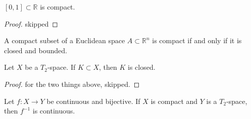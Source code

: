 \begin{thmbox}
    \begin{lemma}
        \([0, 1] \subset \mathbb{R}\) is {\color{maththen}compact}.
    \end{lemma}
\end{thmbox}

\begin{proof}
    skipped
\end{proof}

\begin{thmbox}
    \begin{theorem}
        A compact subset of a Euclidean space \(A \subset \mathbb{R}^n\) is compact if and only if it is closed and bounded.
    \end{theorem}
\end{thmbox}

\begin{thmbox}
    \begin{proposition}
        Let \(X\) be a \(T_2\)-space. If \(K \subset X\), then \(K\) is closed.
    \end{proposition}
\end{thmbox}

\begin{proof}
    for the two things above, skipped.
\end{proof}

\begin{thmbox}
    \begin{lemma}
        Let \(f: X \longrightarrow Y\) be continuous and bijective. If \(X\) is compact and \(Y\) is a \(T_2\)-space, then \(f^{-1}\) is continuous.
    \end{lemma}
\end{thmbox}